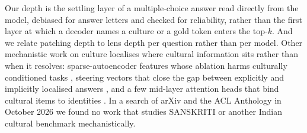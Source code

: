Our depth is the settling layer of a multiple-choice answer read directly from the model, debiased for answer letters and checked for reliability, rather than the first layer at which a decoder names a culture or a gold token enters the top-$k$.
And we relate patching depth to lens depth per question rather than per model.
Other mechanistic work on culture localises where cultural information sits rather than when it resolves: sparse-autoencoder features whose ablation harms culturally conditioned tasks \citep{zou-etal-2026-deciphering}, steering vectors that close the gap between explicitly and implicitly localised answers \citep{veselovsky-etal-2026-localized}, and a few mid-layer attention heads that bind cultural items to identities \citep{floro2026binding}.
In a search of arXiv and the ACL Anthology in October 2026 we found no work that studies SANSKRITI or another Indian cultural benchmark mechanistically.
